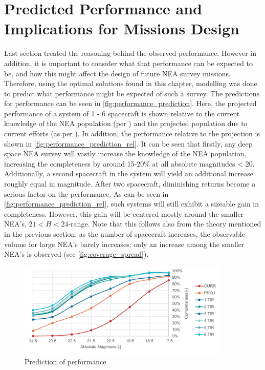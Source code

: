 \section{Predicted Performance and Implications for Missions Design}
\label{sec:results_performance}
Last section treated the reasoning behind the observed performance. However in addition, it is important to consider what that performance can be expected to be, and how this might affect the design of future NEA survey missions. Therefore, using the optimal solutions found in this chapter, modelling was done to predict what performance might be expected of such a survey. The predictions for performance can be seen in \autoref{fig:performance_prediction}. Here, the projected performance of a system of 1 - 6 spacecraft is shown relative to the current knowledge of the NEA population (per \cite{HarrisPopulation}) and the projected population due to current efforts (as per \cite{2017NEOSDT}). In addition, the performance relative to the projection is shown in \autoref{fig:performance_prediction_rel}. It can be seen that firstly, any deep space NEA survey will vastly increase the knowledge of the NEA population, increasing the completeness by around 15-20\% at all absolute magnitudes < 20. Additionally, a second spacecraft in the system will yield an additional increase roughly equal in magnitude. After two spacecraft, diminishing returns become a serious factor on the performance. As can be seen in \autoref{fig:performance_prediction_rel}, such systems will still exhibit a sizeable gain in completeness. However, this gain will be centered mostly around the smaller NEA's, $21 < H < 24$-range. Note that this follows also from the theory mentioned in the previous section: as the number of spacecraft increases, the observable volume for large NEA's barely increases; only an increase among the smaller NEA's is observed (see \autoref{fig:coverage_spread}).\\


\begin{figure}[htbp]
 \centering
 \includegraphics[width=0.9\textwidth]{img/performance_prediction.pdf}
 \caption{Prediction of performance}
 \label{fig:performance_prediction}
\end{figure}


